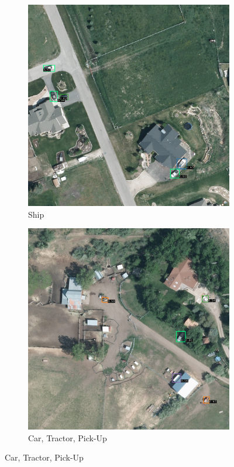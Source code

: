 \begin{figure}[h!]
    \begin{subfigure}[t]{0.38\textwidth}
        \centering
        \includegraphics[width=\linewidth]{images/015Results/01abb_vs_obb/comp_images/aab_old/509.png}
        \caption{Ship}
    \end{subfigure}
    \begin{subfigure}[t]{0.38\textwidth}
        \centering
        \includegraphics[width=\linewidth]{images/015Results/01abb_vs_obb/comp_images/aab_old/523.png}
        \caption{Car, Tractor, Pick-Up}
    \end{subfigure}
    

\end{figure}
